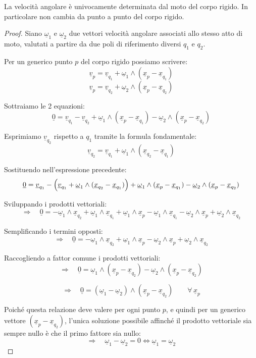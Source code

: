 \begin{theorem}{}
    La velocità angolare   è univocamente determinata dal moto del corpo rigido. In particolare non cambia da punto a punto del corpo rigido.
\end{theorem}
\begin{proof}
Siano $\underline{\omega}_1$ e $\underline{\omega}_2$ due vettori velocità angolare associati allo stesso atto di moto, valutati a partire da due poli di riferimento diversi $q_1$ e $q_2$.

Per un generico punto $p$ del corpo rigido possiamo scrivere:
\[
\underline{v}_p=\underline{v}_{q_1}+\underline{\omega}_1\wedge(\underline{x}_p-\underline{x}_{q_1})
\]
\[
\underline{v}_p=\underline{v}_{q_2}+\underline{\omega}_2\wedge(\underline{x}_p-\underline{x}_{q_2})
\]

Sottraiamo le 2 equazioni:
\[
\underline{0}=\underline{v}_{q_1}-\underline{v}_{q_2}
+\underline{\omega}_1\wedge(\underline{x}_p-\underline{x}_{q_1})
-\underline{\omega}_2\wedge(\underline{x}_p-\underline{x}_{q_2})
\]

Esprimiamo $\underline{v}_{q_2}$ rispetto a $q_1$ tramite la formula fondamentale:
\[
\underline{v}_{q_2}=\underline{v}_{q_1}+\underline{\omega}_1\wedge(\underline{x}_{q_2}-\underline{x}_{q_1})
\]

Sostituendo nell'espressione precedente:
\[
\underline{0}
=
\underline{v}_{q_1}
-
\Bigl(\underline{v}_{q_1}+\underline{\omega}_1\wedge(\underline{x}_{q_2}-\underline{x}_{q_1})\Bigr)
+\underline{\omega}_1\wedge(\underline{x}_p-\underline{x}_{q_1})
-\underline{\omega}_2\wedge(\underline{x}_p-\underline{x}_{q_2})
\]

Sviluppando i prodotti vettoriali:
\[
\Rightarrow\quad
\underline{0}
=
-\underline{\omega}_1\wedge \underline{x}_{q_2}
+\underline{\omega}_1\wedge \underline{x}_{q_1}
+\underline{\omega}_1\wedge \underline{x}_p
-\underline{\omega}_1\wedge \underline{x}_{q_1}
-\underline{\omega}_2\wedge \underline{x}_p
+\underline{\omega}_2\wedge \underline{x}_{q_2}
\]

Semplificando i termini opposti:
\[
\Rightarrow\quad
\underline{0}
=
-\underline{\omega}_1\wedge \underline{x}_{q_2}
+\underline{\omega}_1\wedge \underline{x}_p
-\underline{\omega}_2\wedge \underline{x}_p
+\underline{\omega}_2\wedge \underline{x}_{q_2}
\]

Raccogliendo a fattor comune i prodotti vettoriali:
\[
\Rightarrow\quad
\underline{0}
=
\underline{\omega}_1\wedge(\underline{x}_p-\underline{x}_{q_2})
-\underline{\omega}_2\wedge(\underline{x}_p-\underline{x}_{q_2})
\]

\[
\Rightarrow\quad
\underline{0}
=
(\underline{\omega}_1-\underline{\omega}_2)\wedge(\underline{x}_p-\underline{x}_{q_2})
\qquad \forall\,\underline{x}_p
\]

Poiché questa relazione deve valere per ogni punto $p$, e quindi per un generico vettore $(\underline{x}_p-\underline{x}_{q_2})$, l'unica soluzione possibile affinché il prodotto vettoriale sia sempre nullo è che il primo fattore sia nullo:
\[
\Rightarrow\quad
\underline{\omega}_1-\underline{\omega}_2=0
\iff
\underline{\omega}_1=\underline{\omega}_2
\]
\end{proof}

